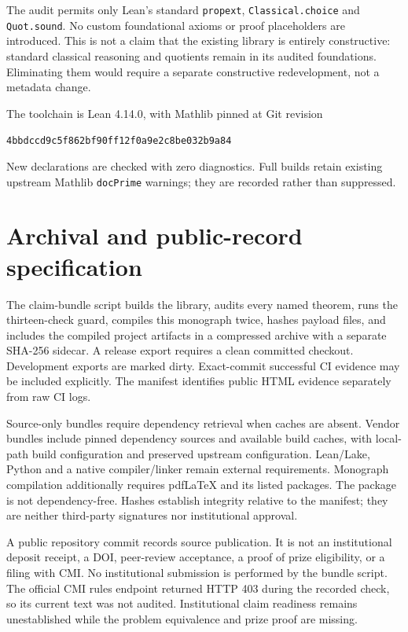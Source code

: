 \documentclass[11pt]{article}
\begin{document}
The audit permits only Lean's standard \texttt{propext},
\texttt{Classical.choice} and \texttt{Quot.sound}. No custom foundational axioms
or proof placeholders are introduced. This is not a claim that the existing
library is entirely constructive: standard classical reasoning and quotients
remain in its audited foundations. Eliminating them would require a separate
constructive redevelopment, not a metadata change.

The toolchain is Lean 4.14.0, with Mathlib pinned at Git revision
\begin{center}\texttt{4bbdccd9c5f862bf90ff12f0a9e2c8be032b9a84}\end{center}
New declarations are checked
with zero diagnostics. Full builds retain existing upstream Mathlib
\texttt{docPrime} warnings; they are recorded rather than suppressed.

\section{Archival and public-record specification}
The claim-bundle script builds the library, audits every named theorem, runs
the thirteen-check guard, compiles this monograph twice, hashes payload files,
and includes the compiled project artifacts in a compressed archive with a
separate SHA-256 sidecar. A release export
requires a clean committed checkout. Development exports are marked dirty.
Exact-commit successful CI evidence may be included explicitly. The manifest
identifies public HTML evidence separately from raw CI logs.

Source-only bundles require dependency retrieval when caches are absent.
Vendor bundles include pinned dependency sources and available build caches,
with local-path build configuration and preserved upstream configuration.
Lean/Lake, Python and a native compiler/linker remain external requirements.
Monograph compilation additionally requires pdfLaTeX and its listed packages.
The package is not dependency-free. Hashes establish integrity relative to the
manifest; they are neither third-party signatures nor institutional approval.

A public repository commit records source publication. It is not an
institutional deposit receipt, a DOI, peer-review acceptance, a proof of prize
eligibility, or a filing with CMI. No institutional submission is performed by
the bundle script. The official CMI rules endpoint returned HTTP 403 during
the recorded check, so its current text was not audited. Institutional claim
readiness remains unestablished while the problem equivalence and prize proof
are missing.
\end{document}

